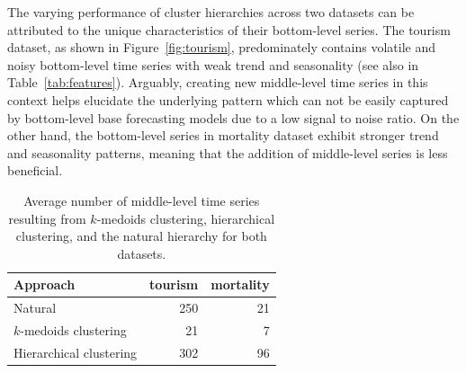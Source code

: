 \documentclass[a4paper,review,12pt,authoryear]{elsarticle}
\begin{document}
The varying performance of cluster hierarchies across two datasets can be attributed to the unique characteristics of their bottom-level series.
The tourism dataset, as shown in Figure~\ref{fig:tourism}, predominately contains volatile and noisy bottom-level time series with weak trend and seasonality (see also in  Table~\ref{tab:features}). Arguably, creating new middle-level time series in this context helps elucidate the underlying pattern which can not be easily captured by bottom-level base forecasting models due to a low signal to noise ratio. 
On the other hand, the bottom-level series in mortality dataset exhibit stronger trend and seasonality patterns, meaning that the addition of middle-level series is less beneficial.\\

\begin{table}[!h]
    \centering
    \caption{\label{tab:P3_number_series}Average number of middle-level time series resulting from $k$-medoids clustering, hierarchical clustering, and the natural hierarchy for both datasets.}
    \begin{tabular}{lrr}
    \toprule
        Approach &  tourism& mortality \\ \midrule
     Natural &250  & 21 \\ 
        $k$-medoids clustering &  21&  7\\ 
        Hierarchical clustering &302   & 96\\ \bottomrule
    \end{tabular}
\end{table}
\end{document}
